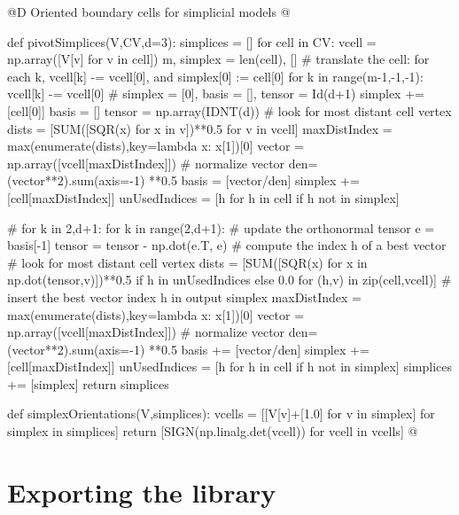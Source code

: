 \documentclass[11pt,oneside]{article}	%
\begin{document}
@D Oriented boundary cells for simplicial models
@{def pivotSimplices(V,CV,d=3):
	simplices = []
	for cell in CV:
		vcell = np.array([V[v] for v in cell])
		m, simplex = len(cell), []
		# translate the cell: for each k, vcell[k] -= vcell[0], and simplex[0] := cell[0]
		for k in range(m-1,-1,-1): vcell[k] -= vcell[0]
		# simplex = [0], basis = [], tensor = Id(d+1)
		simplex += [cell[0]]
		basis = []
		tensor = np.array(IDNT(d))
		# look for most distant cell vertex
		dists = [SUM([SQR(x) for x in v])**0.5 for v in vcell]
		maxDistIndex = max(enumerate(dists),key=lambda x: x[1])[0]
		vector = np.array([vcell[maxDistIndex]])
		# normalize vector
		den=(vector**2).sum(axis=-1) **0.5
		basis = [vector/den]
		simplex += [cell[maxDistIndex]]
		unUsedIndices = [h for h in cell if h not in simplex]
		
		# for k in {2,d+1}:
		for k in range(2,d+1):
			# update the orthonormal tensor
			e = basis[-1]
			tensor = tensor - np.dot(e.T, e)
			# compute the index h of a best vector
			# look for most distant cell vertex
			dists = [SUM([SQR(x) for x in np.dot(tensor,v)])**0.5
			if h in unUsedIndices else 0.0
			for (h,v) in zip(cell,vcell)]
			# insert the best vector index h in output simplex
			maxDistIndex = max(enumerate(dists),key=lambda x: x[1])[0]
			vector = np.array([vcell[maxDistIndex]])
			# normalize vector
			den=(vector**2).sum(axis=-1) **0.5
			basis += [vector/den]
			simplex += [cell[maxDistIndex]]
			unUsedIndices = [h for h in cell if h not in simplex]
		simplices += [simplex]
	return simplices

def simplexOrientations(V,simplices):
	vcells = [[V[v]+[1.0] for v in simplex] for simplex in simplices]
	return [SIGN(np.linalg.det(vcell)) for vcell in vcells]
@}



\section{Exporting the library}
\end{document}
